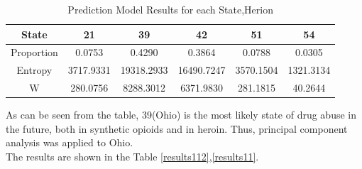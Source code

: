 \documentclass[12pt]{mcmthesis}
\begin{document}
\begin{table}[htb]
\centering
\caption{Prediction Model Results for each State,Herion}\label{results12}
\begin{tabular}{|c|c|c|c|c|c|}
\hline
State      & 21        & 39         & 42         & 51        & 54        \\\hline
Proportion & 0.0753    & 0.4290     & 0.3864     & 0.0788    & 0.0305    \\\hline
Entropy    & 3717.9331 & 19318.2933 & 16490.7247 & 3570.1504 & 1321.3134 \\\hline
W          & 280.0756  & 8288.3012  & 6371.9830  & 281.1815  & 40.2644  \\\hline
\end{tabular}
\end{table}
As can be seen from the table, 39(Ohio) is the most likely state of drug abuse in the future, both in synthetic opioids and in heroin. Thus, principal component analysis was applied to Ohio.\\The results are shown in the Table \ref{results112},\ref{results11}.
\end{document}
